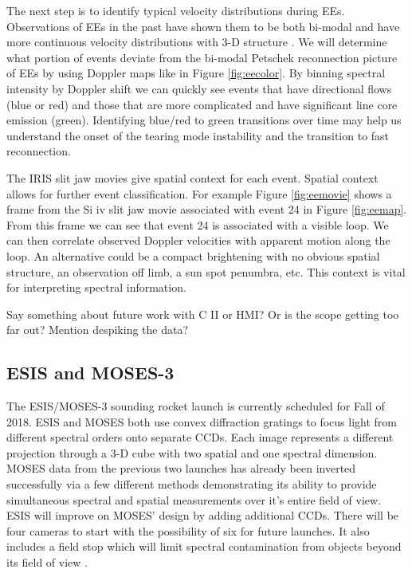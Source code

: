 \documentclass[]{aastex6}
\begin{document}
	
	The next step is to identify typical velocity distributions during EEs.  Observations of EEs in the past have shown them to be both bi-modal \citep{Innes1997,Rust2017} and have more continuous velocity distributions with 3-D structure \citep{Fox2010,Innes2015,Rouppe2017}.  We will determine what portion of events deviate from the bi-modal Petschek reconnection picture of EEs by using Doppler maps like in Figure \ref{fig:eecolor}. By binning spectral intensity by Doppler shift we can quickly see events that have directional flows (blue or red) and those that are more complicated and have significant line core emission (green).  Identifying blue/red to green transitions over time may help us understand the onset of the tearing mode instability and the transition to fast reconnection.
	
	The IRIS slit jaw movies give spatial context for each event.  Spatial context allows for further event classification. For example Figure \ref{fig:eemovie} shows a frame from the Si {\sc iv} slit jaw movie associated with event 24 in Figure \ref{fig:eemap}.  From this frame we can see that event 24 is associated with a visible loop.  We can then correlate observed Doppler velocities with apparent motion along the loop.  An alternative could be a compact brightening with no obvious spatial structure, an observation off limb, a sun spot penumbra, etc.  This context is vital for interpreting spectral information.
	
	Say something about future work with C II or HMI?  Or is the scope getting too far out?  Mention despiking the data?
	

	\subsection{ESIS and MOSES-3}
	The ESIS/MOSES-3 sounding rocket launch is currently scheduled for Fall of 2018.  ESIS and MOSES both use convex diffraction gratings to focus light from different spectral orders onto separate CCDs.  Each image represents a different projection through a 3-D cube with two spatial and one spectral dimension.  MOSES data from the previous two launches has already been inverted successfully via a few different methods \citep{Fox2010,Courrier2015,Smart2016,Smart2017,Rust2017} demonstrating its ability to provide simultaneous spectral and spatial measurements over it's entire field of view.  ESIS will improve on MOSES' design by adding additional CCDs.  There will be four cameras to start with the possibility of six for future launches.  It also includes a field stop which will limit spectral contamination from objects beyond its field of view \citep{Parker2016}.
	
\end{document}
